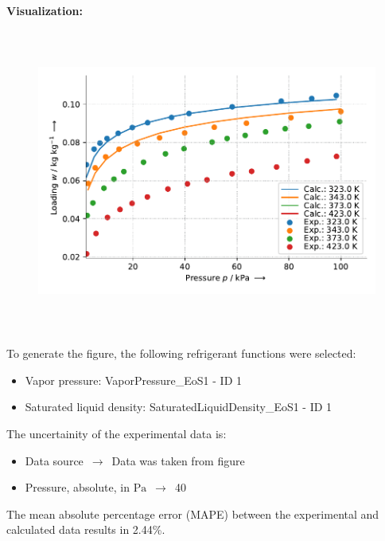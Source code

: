 \textbf{Visualization:}
%
\begin{figure}[!htp]
{\noindent\includegraphics[height=10cm, keepaspectratio]{figs/ads/ads_Propylene_zeolite_pellet_5A_DubininAstakhov_1.pdf}}
\end{figure}
%

To generate the figure, the following refrigerant functions were selected:
\begin{itemize}
\item Vapor pressure: VaporPressure\_EoS1 - ID 1
\item Saturated liquid density: SaturatedLiquidDensity\_EoS1 - ID 1
\end{itemize}

The uncertainity of the experimental data is:
\begin{itemize}
\item Data source $\,\to\,$ Data was taken from figure
\item Pressure, absolute, in $\si{\pascal}$ $\,\to\,$ 40
\end{itemize}

The mean absolute percentage error (MAPE) between the experimental and calculated data results in 2.44\%.
\FloatBarrier
\newpage
